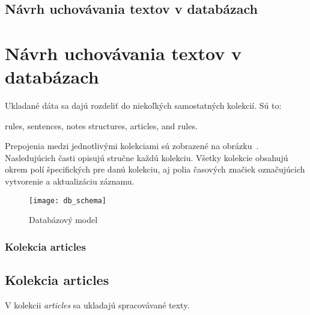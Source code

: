 %
%
{
	\subsection{Návrh uchovávania textov v databázach}
}
{
	\section{Návrh uchovávania textov v databázach}
}
\label{subsection:our_design_persisting_data}
Ukladané dáta sa dajú rozdeliť do niekoľkých samostatných kolekcií. Sú to:

\begin{my_itemize}
	\myitem rules,
	\myitem sentences,
	\myitem notes
	\myitem structures,
	\myitem articles,
	\myitem and rules.
\end{my_itemize}
	
Prepojenia medzi jednotlivými kolekciami sú zobrazené na obrázku~. Nasledujúcich časti opisujú stručne každú kolekciu. Všetky kolekcie obsahujú okrem polí špecifických pre danú kolekciu, aj polia časových značiek označujúcich vytvorenie a aktualizáciu záznamu.

\begin{figure}[H]
	\begin{center}\texttt{[image: db\_schema]}\end{center}
	\caption[Databázový model]{Databázový model}\label{fig:db_schema}
\end{figure}

%
%
{
	\subsubsection{Kolekcia articles}
}
{
	\subsection{Kolekcia articles}
}
\label{subsubsection:collection_articles}
V kolekcii \textit{articles} sa ukladajú spracovávané texty. 

